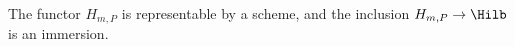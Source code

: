 \begin{lemma}\label{lem:hilbert}
The functor $H_{m,P}$ is representable by a scheme, and the inclusion $H_{m,P} \rightarrow \Hilb$ is an immersion.
\end{lemma}
